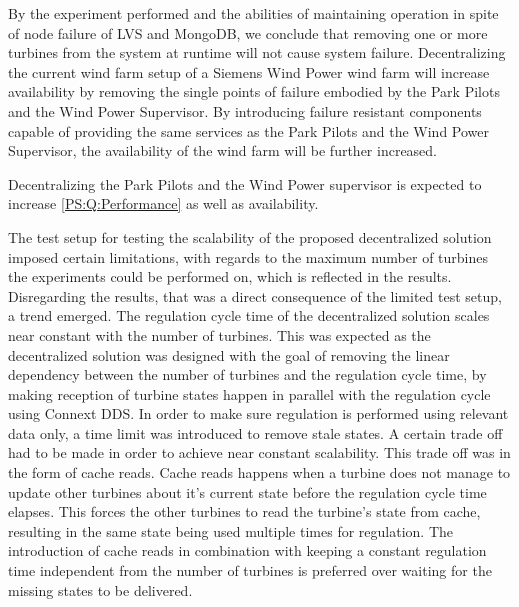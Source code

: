 By the experiment performed and the abilities of maintaining operation in spite of node failure of LVS and MongoDB, we conclude that removing one or more turbines from the system at runtime will not cause system failure. Decentralizing the current wind farm setup of a Siemens Wind Power wind farm will increase availability by removing the single points of failure embodied by the Park Pilots and the Wind Power Supervisor. By introducing failure resistant components capable of providing the same services as the Park Pilots and the Wind Power Supervisor, the availability of the wind farm will be further increased.

Decentralizing the Park Pilots and the Wind Power supervisor is expected to increase \ref{PS:Q:Performance} as well as availability.

The test setup for testing the scalability of the proposed decentralized solution imposed certain limitations, with regards to the maximum number of turbines the experiments could be performed on, which is reflected in the results. Disregarding the results, that was a direct consequence of the limited test setup, a trend emerged. The regulation cycle time of the decentralized solution scales near constant with the number of turbines. This was expected as the decentralized solution was designed with the goal of removing the linear dependency between the number of turbines and the regulation cycle time, by making reception of turbine states happen in parallel with the regulation cycle using Connext DDS. In order to make sure regulation is performed using relevant data only, a time limit was introduced to remove stale states. A certain trade off had to be made in order to achieve near constant scalability. This trade off was in the form of cache reads.
Cache reads happens when a turbine does not manage to update other turbines about it's current state before the regulation cycle time elapses. This forces the other turbines to read the turbine's state from cache, resulting in the same state being used multiple times for regulation. The introduction of cache reads in combination with keeping a constant regulation time independent from the number of turbines is preferred over waiting for the missing states to be delivered.

